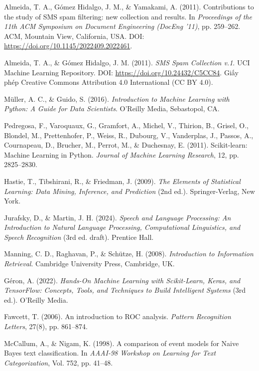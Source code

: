 \begin{enumerate}[label={[\arabic*]}, resume]
    \item Almeida, T. A., Gómez Hidalgo, J. M., \& Yamakami, A. (2011). Contributions to the study of SMS spam filtering: new collection and results. In \textit{Proceedings of the 11th ACM Symposium on Document Engineering (DocEng '11)}, pp. 259--262. ACM, Mountain View, California, USA. DOI: \url{https://doi.org/10.1145/2022409.2022461}.
    \item Almeida, T. A., \& Gómez Hidalgo, J. M. (2011). \textit{SMS Spam Collection v.1}. UCI Machine Learning Repository. DOI: \url{https://doi.org/10.24432/C5CC84}. Giấy phép Creative Commons Attribution 4.0 International (CC BY 4.0).
    \item Müller, A. C., \& Guido, S. (2016). \textit{Introduction to Machine Learning with Python: A Guide for Data Scientists}. O'Reilly Media, Sebastopol, CA.
    \item Pedregosa, F., Varoquaux, G., Gramfort, A., Michel, V., Thirion, B., Grisel, O., Blondel, M., Prettenhofer, P., Weiss, R., Dubourg, V., Vanderplas, J., Passos, A., Cournapeau, D., Brucher, M., Perrot, M., \& Duchesnay, E. (2011). Scikit-learn: Machine Learning in Python. \textit{Journal of Machine Learning Research}, 12, pp. 2825--2830.
    \item Hastie, T., Tibshirani, R., \& Friedman, J. (2009). \textit{The Elements of Statistical Learning: Data Mining, Inference, and Prediction} (2nd ed.). Springer-Verlag, New York.
    \item Jurafsky, D., \& Martin, J. H. (2024). \textit{Speech and Language Processing: An Introduction to Natural Language Processing, Computational Linguistics, and Speech Recognition} (3rd ed. draft). Prentice Hall.
    \item Manning, C. D., Raghavan, P., \& Schütze, H. (2008). \textit{Introduction to Information Retrieval}. Cambridge University Press, Cambridge, UK.
    \item Géron, A. (2022). \textit{Hands-On Machine Learning with Scikit-Learn, Keras, and TensorFlow: Concepts, Tools, and Techniques to Build Intelligent Systems} (3rd ed.). O'Reilly Media.
    \item Fawcett, T. (2006). An introduction to ROC analysis. \textit{Pattern Recognition Letters}, 27(8), pp. 861--874.
    \item McCallum, A., \& Nigam, K. (1998). A comparison of event models for Naive Bayes text classification. In \textit{AAAI-98 Workshop on Learning for Text Categorization}, Vol. 752, pp. 41--48.
\end{enumerate}